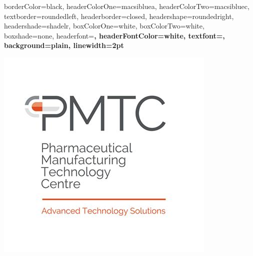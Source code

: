 \documentclass[a0paper,portrait,fontscale=0.3]{baposter}
\begin{document}
\begin{poster}
{%
%
%                               
%
%
%
%
%
%
borderColor=black,
headerColorOne=macsibluea,
headerColorTwo=macsibluec,
textborder=roundedleft,
headerborder=closed,
headershape=roundedright,
headershade=shadelr,
boxColorOne=white,
boxColorTwo=white,
boxshade=none,
headerfont=\Large\bf\textsc, %
headerFontColor=white,
textfont={\setlength{\parindent}{1.5em}},
background=plain,
linewidth=2pt
}
{\begin{minipage}{0.15\textwidth}
	\begin{center}
		\includegraphics[height = 0.08\textheight]{images/pmtc_logo.jpg}

\end{center}
\end{minipage}}
\end{poster}
\end{document}
